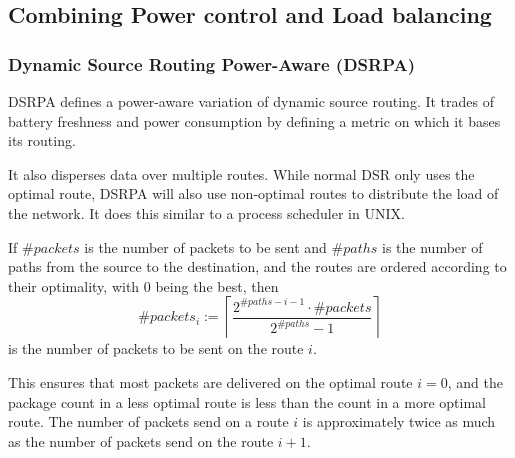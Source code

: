 \subsection{Combining Power control and Load balancing}
\subsubsection{Dynamic Source Routing Power-Aware (DSRPA)}
DSRPA\cite{djenouri2006new} defines a power-aware variation of dynamic source
routing. It trades of battery freshness and power consumption by defining a
metric on which it bases its routing.


It also disperses data over multiple routes.
While normal DSR only uses the optimal route,
DSRPA will also use non-optimal routes to distribute the load of the network. It
does this similar to a process scheduler in UNIX.

If $\#packets$ is the number of packets to be sent and
$\#paths$ is the number of paths from the source to the
destination, and the routes are ordered according to their optimality,
with 0 being the best, then
\[ \#packets_{i} := \left\lceil \frac{2^{\# paths - i - 1} \cdot \# packets}{2^{\#paths} - 1} \right\rceil \]
is the number of packets to be sent on the route $i$.

This ensures that most packets are delivered on the optimal route $i=0$, and
the package count in a less optimal route is less than the count in a more
optimal route. The number of packets send on a route $i$ is approximately
twice as much as the number of packets send on the route $i+1$.

